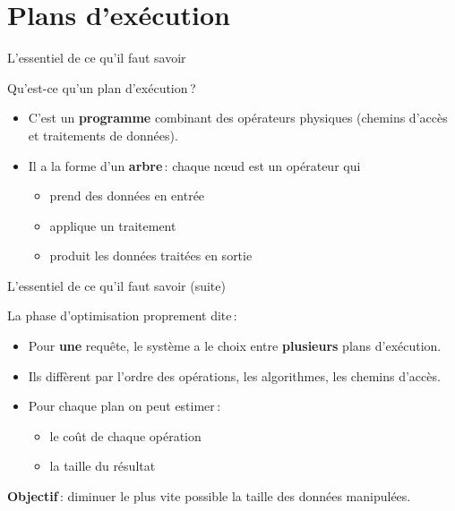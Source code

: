 \section{Plans d'exécution}
\begin{tsp}{L'essentiel de ce qu'il faut savoir}
{
Qu'est-ce qu'un plan d'exécution\,?
  \begin{itemize}
      \item C'est un \textbf{programme} combinant 
               des opérateurs physiques (chemins d'accès
                     et traitements de données).

      \item Il a la forme d'un \textbf{arbre}\,: chaque
              n{\oe}ud est un opérateur qui
  \begin{itemize}
      \item prend des données en entrée
      \item applique un traitement
      \item produit les données traitées en sortie
   \end{itemize}
\end{itemize}


}\end{tsp}
\begin{tsp}{L'essentiel de ce qu'il faut savoir (suite)}
{
La phase d'optimisation proprement dite\,:

  \begin{itemize}
     \item Pour \textbf{une} requête, le système a le choix
               entre \textbf{plusieurs} plans d'exécution.

     \item Ils diffèrent par l'ordre des opérations, 
             les algorithmes, les chemins d'accès.

     \item Pour chaque plan on peut estimer\,:
      \begin{itemize}
          \item le coût de chaque opération
         \item la taille du résultat
      \end{itemize}
      
\end{itemize}

\textbf{Objectif}\,: diminuer le plus vite possible la taille
des données manipulées.

}\end{tsp}
